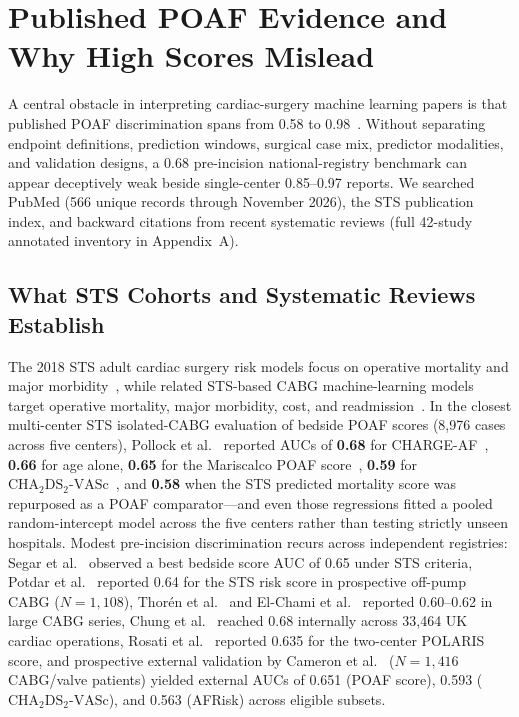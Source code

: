 \section{Published POAF Evidence and Why High Scores Mislead}
\label{sec:literature}

A central obstacle in interpreting cardiac-surgery machine learning papers is that published POAF discrimination spans from 0.58 to 0.98~\cite{fields2025poaf,lopeztuesta2026poaf}. Without separating endpoint definitions, prediction windows, surgical case mix, predictor modalities, and validation designs, a 0.68 pre-incision national-registry benchmark can appear deceptively weak beside single-center 0.85--0.97 reports. We searched PubMed (566 unique records through November 2026), the STS publication index, and backward citations from recent systematic reviews (full 42-study annotated inventory in Appendix~A).

\subsection{What STS Cohorts and Systematic Reviews Establish}
The 2018 STS adult cardiac surgery risk models focus on operative mortality and major morbidity~\cite{shahian2018sts,obrien2018sts2}, while related STS-based CABG machine-learning models target operative mortality, major morbidity, cost, and readmission~\cite{zeavera2022stsml}. In the closest multi-center STS isolated-CABG evaluation of bedside POAF scores (8,976 cases across five centers), Pollock et al.~\cite{pollock2018sts} reported AUCs of \textbf{0.68} for CHARGE-AF~\cite{alonso2013chargeaf}, \textbf{0.66} for age alone, \textbf{0.65} for the Mariscalco POAF score~\cite{mariscalco2014poaf}, \textbf{0.59} for $\mathrm{CHA_2DS_2\text{-}VASc}$~\cite{lip2010cha2ds2vasc}, and \textbf{0.58} when the STS predicted mortality score was repurposed as a POAF comparator---and even those regressions fitted a pooled random-intercept model across the five centers rather than testing strictly unseen hospitals. Modest pre-incision discrimination recurs across independent registries: Segar et al.~\cite{segar2023sts} observed a best bedside score AUC of 0.65 under STS criteria, Potdar et al.~\cite{potdar2022offpump} reported 0.64 for the STS risk score in prospective off-pump CABG ($N=1{,}108$), Thor{\'e}n et al.~\cite{thoren2012cabg} and El-Chami et al.~\cite{elchami2012poaf} reported 0.60--0.62 in large CABG series, Chung et al.~\cite{chung2023uk} reached 0.68 internally across 33,464 UK cardiac operations, Rosati et al.~\cite{rosati2025polaris} reported 0.635 for the two-center POLARIS score, and prospective external validation by Cameron et al.~\cite{cameron2018validation} ($N=1{,}416$ CABG/valve patients) yielded external AUCs of 0.651 (POAF score), 0.593 ($\mathrm{CHA_2DS_2\text{-}VASc}$), and 0.563 (AFRisk) across eligible subsets.

